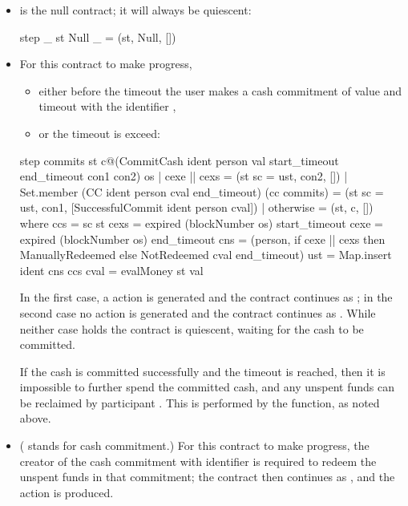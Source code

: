 \documentclass[
      acmsmall
    , screen
  ]{acmart}
\begin{document}
\begin{itemize} 

\item {} is the null contract; it will always be quiescent:

\smallskip
\begin{haskellcode}
step _ st Null _ = (st, Null, [])
\end{haskellcode}
\smallskip

\item {}  For this contract to make progress,\begin{itemize}
\item either before the timeout  the user  makes a cash commitment of value 
 and timeout   with the identifier , 
\item
or the timeout  is exceed:
\end{itemize} 

\smallskip
\begin{haskellcode}
step 
  commits 
  st 
  c@(CommitCash ident person val start_timeout end_timeout con1 con2) 
  os
  | cexe || cexs = (st {sc = ust}, con2, [])
  | Set.member (CC ident person cval end_timeout) (cc commits)
        = (st {sc = ust}, con1, [SuccessfulCommit ident person cval])
  | otherwise = (st, c, [])
  where ccs = sc st
        cexs = expired (blockNumber os) start_timeout
        cexe = expired (blockNumber os) end_timeout
        cns = (person, if cexe || cexs 
                          then ManuallyRedeemed 
                          else NotRedeemed cval end_timeout)
        ust = Map.insert ident cns ccs
        cval = evalMoney st val
\end{haskellcode}
\smallskip
In the first case, a  action is generated and the contract continues as 
; in the second case no action is generated and the contract continues as 
. While neither case holds the contract is quiescent, waiting for the cash to be committed. 

If the cash is committed successfully and the timeout  is reached, then it is impossible to further spend the committed cash, and any unspent funds can be reclaimed by participant .
 This is performed by the  function, as noted above.

\item {} ( stands for cash commitment.) For this contract to make progress, the creator of the cash commitment with identifier  is required to redeem the unspent funds in that commitment; the contract then continues as , and the action  is produced. 


\end{itemize}
\end{document}

